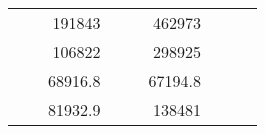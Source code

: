 \begin{table}[H]
\begin{tabular}{|ccrccrccc}
\multicolumn{1}{|c|}{\cellcolor[HTML]{FFFFC7}}                                & \multicolumn{1}{c|}{\cellcolor[HTML]{DDFDFF}}                      & \multicolumn{1}{r|}{\cellcolor[HTML]{DAE8FC}191843}    & \multicolumn{1}{c|}{\cellcolor[HTML]{FFFFC7}}                                & \multicolumn{1}{c|}{\cellcolor[HTML]{DDFDFF}}                       & \multicolumn{1}{r|}{\cellcolor[HTML]{DDFDFF}462973}    &                                                                              &                                                                    &                                                        \\ \cline{3-3} \cline{6-6}
\multicolumn{1}{|c|}{\cellcolor[HTML]{FFFFC7}}                                & \multicolumn{1}{c|}{\cellcolor[HTML]{DDFDFF}}                      & \multicolumn{1}{r|}{\cellcolor[HTML]{DDFDFF}106822}    & \multicolumn{1}{c|}{\cellcolor[HTML]{FFFFC7}}                                & \multicolumn{1}{c|}{\cellcolor[HTML]{DDFDFF}}                       & \multicolumn{1}{r|}{\cellcolor[HTML]{DAE8FC}298925}    &                                                                              &                                                                    &                                                        \\ \cline{3-3} \cline{6-6}
\multicolumn{1}{|c|}{\cellcolor[HTML]{FFFFC7}}                                & \multicolumn{1}{c|}{\cellcolor[HTML]{DDFDFF}}                      & \multicolumn{1}{r|}{\cellcolor[HTML]{DAE8FC}68916.8}   & \multicolumn{1}{c|}{\cellcolor[HTML]{FFFFC7}}                                & \multicolumn{1}{c|}{\cellcolor[HTML]{DDFDFF}}                       & \multicolumn{1}{r|}{\cellcolor[HTML]{DDFDFF}67194.8}   &                                                                              &                                                                    &                                                        \\ \cline{3-3} \cline{6-6}
\multicolumn{1}{|c|}{\cellcolor[HTML]{FFFFC7}}                                & \multicolumn{1}{c|}{\cellcolor[HTML]{DDFDFF}}                      & \multicolumn{1}{r|}{\cellcolor[HTML]{DDFDFF}81932.9}   & \multicolumn{1}{c|}{\cellcolor[HTML]{FFFFC7}}                                & \multicolumn{1}{c|}{\cellcolor[HTML]{DDFDFF}}                       & \multicolumn{1}{r|}{\cellcolor[HTML]{DAE8FC}138481}    &                                                                              &                                                                    &                                                        \\ \cline{3-3} \cline{6-6}

\end{tabular}
\end{table}
